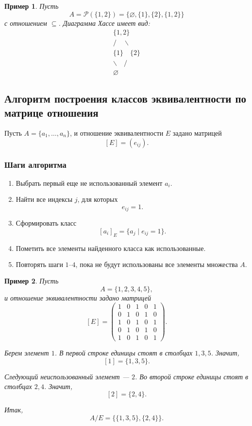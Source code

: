 \documentclass[12pt,a4paper]{article}
\newtheorem{example}{Пример}
\begin{document}
\begin{example}
Пусть
\[
A=\mathcal P(\{1,2\})
=
\{\varnothing,\{1\},\{2\},\{1,2\}\}
\]
с отношением $\subseteq$.
Диаграмма Хассе имеет вид:
\[
\begin{array}{c}
\{1,2\}\\
/\quad \backslash\\
\{1\}\quad \{2\}\\
\backslash\quad /\\
\varnothing
\end{array}
\]
\end{example}

\subsection{Алгоритм построения классов эквивалентности по матрице отношения}

Пусть $A=\{a_1,\dots,a_n\}$, и отношение эквивалентности $E$ задано матрицей
\[
[E]=(e_{ij}).
\]

\subsubsection*{Шаги алгоритма}

\begin{enumerate}
\item Выбрать первый еще не использованный элемент $a_i$.
\item Найти все индексы $j$, для которых
\[
e_{ij}=1.
\]
\item Сформировать класс
\[
[a_i]_E=\{a_j\mid e_{ij}=1\}.
\]
\item Пометить все элементы найденного класса как использованные.
\item Повторять шаги $1$--$4$, пока не будут использованы все элементы множества $A$.
\end{enumerate}

\begin{example}
Пусть
\[
A=\{1,2,3,4,5\},
\]
и отношение эквивалентности задано матрицей
\[
[E]=
\begin{pmatrix}
1&0&1&0&1\\
0&1&0&1&0\\
1&0&1&0&1\\
0&1&0&1&0\\
1&0&1&0&1
\end{pmatrix}.
\]

Берем элемент $1$.
В первой строке единицы стоят в столбцах $1,3,5$.
Значит,
\[
[1]=\{1,3,5\}.
\]

Следующий неиспользованный элемент --- $2$.
Во второй строке единицы стоят в столбцах $2,4$.
Значит,
\[
[2]=\{2,4\}.
\]

Итак,
\[
A/E=\{\{1,3,5\},\{2,4\}\}.
\]
\end{example}
\end{document}
